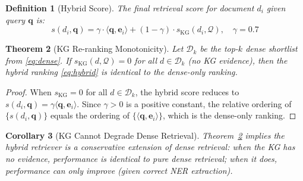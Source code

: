 \documentclass[10pt,conference]{IEEEtran}
\theoremstyle{ieeethm}
\newtheorem{theorem}{Theorem}
\newtheorem{corollary}[theorem]{Corollary}
\theoremstyle{ieeedef}
\newtheorem{definition}[theorem]{Definition}
\theoremstyle{ieeeremark}
\begin{document}
\begin{definition}[Hybrid Score]
\label{def:hybrid}
The final retrieval score for document $d_i$ given query $\mathbf{q}$ is:
\begin{equation}
s(d_i, \mathbf{q}) = \gamma \cdot \langle \mathbf{q}, \mathbf{e}_i \rangle + (1-\gamma) \cdot s_{\text{KG}}(d_i, \mathcal{Q}),\quad \gamma=0.7
\label{eq:hybrid}
\end{equation}
\end{definition}

\begin{theorem}[KG Re-ranking Monotonicity]
\label{thm:monotonicity}
Let $\mathcal{D}_k$ be the top-$k$ dense shortlist from \eqref{eq:dense}. If $s_{\text{KG}}(d, \mathcal{Q}) = 0$ for all $d \in \mathcal{D}_k$ (no KG evidence), then the hybrid ranking \eqref{eq:hybrid} is identical to the dense-only ranking.
\end{theorem}
\begin{proof}
When $s_{\text{KG}} = 0$ for all $d \in \mathcal{D}_k$, the hybrid score reduces to $s(d_i,\mathbf{q}) = \gamma\langle\mathbf{q},\mathbf{e}_i\rangle$. Since $\gamma > 0$ is a positive constant, the relative ordering of $\{s(d_i,\mathbf{q})\}$ equals the ordering of $\{\langle\mathbf{q},\mathbf{e}_i\rangle\}$, which is the dense-only ranking.
\end{proof}

\begin{corollary}[KG Cannot Degrade Dense Retrieval]
\label{cor:no_degrade}
Theorem~\ref{thm:monotonicity} implies the hybrid retriever is a \emph{conservative extension} of dense retrieval: when the KG has no evidence, performance is identical to pure dense retrieval; when it does, performance can only improve (given correct NER extraction).
\end{corollary}
\end{document}
